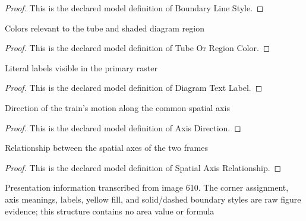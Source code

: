 \begin{proof}
  This is the declared model definition of Boundary Line Style.
\end{proof}
\begin{definition}
  \label{def:physics:phyx-mini-0610:phyxminiproblems-problemphyxmini0610-tubeorregioncolor}
  Colors relevant to the tube and shaded diagram region
\end{definition}
\begin{proof}
  This is the declared model definition of Tube Or Region Color.
\end{proof}
\begin{definition}
  \label{def:physics:phyx-mini-0610:phyxminiproblems-problemphyxmini0610-diagramtextlabel}
  Literal labels visible in the primary raster
\end{definition}
\begin{proof}
  This is the declared model definition of Diagram Text Label.
\end{proof}
\begin{definition}
  \label{def:physics:phyx-mini-0610:phyxminiproblems-problemphyxmini0610-axisdirection}
  Direction of the train's motion along the common spatial axis
\end{definition}
\begin{proof}
  This is the declared model definition of Axis Direction.
\end{proof}
\begin{definition}
  \label{def:physics:phyx-mini-0610:phyxminiproblems-problemphyxmini0610-spatialaxisrelationship}
  Relationship between the spatial axes of the two frames
\end{definition}
\begin{proof}
  This is the declared model definition of Spatial Axis Relationship.
\end{proof}
\begin{definition}
  \label{def:physics:phyx-mini-0610:phyxminiproblems-problemphyxmini0610-fluorescenttubespacetimefigure}
  Presentation information transcribed from image 610. The corner assignment, axis meanings, labels, yellow fill, and solid/dashed boundary styles are raw figure evidence; this structure contains no area value or formula
\end{definition}
